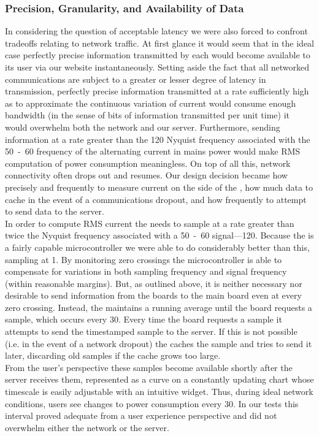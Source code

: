\subsubsection{Precision, Granularity, and Availability of Data}
In considering the question of acceptable latency we were also forced to confront tradeoffs relating to network traffic. At first glance it would seem that in the ideal case perfectly precise information transmitted by each \netlet would become available to its user via our website instantaneously. Setting aside the fact that all networked communications are subject to a greater or lesser degree of latency in transmission, perfectly precise information transmitted at a rate sufficiently high as to approximate the continuous variation of current would consume enough bandwidth (in the sense of bits of information transmitted per unit time) it would overwhelm both the network and our server. Furthermore, sending information at a rate greater than the \si{120}{\hertz} Nyquist frequency associated with the \si{50-60}{\hertz} frequency of the alternating current in mains power would make RMS computation of power consumption meaningless. On top of all this, network connectivity often drops out and resumes. Our design decision became how precisely and frequently to measure current on the side of the \netlet, how much data to cache in the event of a communications dropout, and how frequently to attempt to send data to the server.\\

In order to compute RMS current the \atmega needs to sample at a rate greater than twice the Nyquist frequency associated with a \si{50-60}{\hertz} signal---\si{120}{\hertz}. Because the \atmega is a fairly capable microcontroller we were able to do considerably better than this, sampling at \si{1}{\kilohertz}. By monitoring zero crossings the microcontroller is able to compensate for variations in both sampling frequency and signal frequency (within reasonable margins). But, as outlined above, it is neither necessary nor desirable to send information from the \atmega boards to the main \arm board even at every zero crossing. Instead, the \atmega maintains a running average until the \arm board requests a sample, which occurs every \si{30}{\second}. Every time the \arm board requests a sample it attempts to send the timestamped sample to the server. If this is not possible (i.e. in the event of a network dropout) the \netlet caches the sample and tries to send it later, discarding old samples if the cache grows too large.\\

From the user's perspective these samples become available shortly after the server receives them, represented as a curve on a constantly updating chart whose timescale is easily adjustable with an intuitive widget. Thus, during ideal network conditions, users see changes to power consumption every \si{30}{\second}. In our tests this interval proved adequate from a user experience perspective and did not overwhelm either the network or the server.\\
